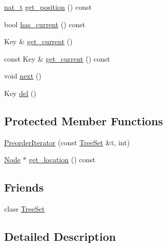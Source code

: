 \begin{DoxyCompactItemize}
\item 
\hyperlink{namespace_designar_aa72662848b9f4815e7bf31a7cf3e33d1}{nat\+\_\+t} \hyperlink{class_designar_1_1_tree_set_1_1_preorder_iterator_a76a9499f0414651a4399f57f7568b168}{get\+\_\+position} () const
\item 
bool \hyperlink{class_designar_1_1_tree_set_1_1_preorder_iterator_a24d3c99c070468afe487e41fb17fec2d}{has\+\_\+current} () const
\item 
Key \& \hyperlink{class_designar_1_1_tree_set_1_1_preorder_iterator_a46bb02ac787f59ccd00eb1dc9ec360d1}{get\+\_\+current} ()
\item 
const Key \& \hyperlink{class_designar_1_1_tree_set_1_1_preorder_iterator_a1361ceae79bd57279177e2a1a76ee200}{get\+\_\+current} () const
\item 
void \hyperlink{class_designar_1_1_tree_set_1_1_preorder_iterator_a8d9d382d80687846dc21f9b5445d59c7}{next} ()
\item 
Key \hyperlink{class_designar_1_1_tree_set_1_1_preorder_iterator_aafc85391980a0a0d29b1f86827c47018}{del} ()
\end{DoxyCompactItemize}
\subsection*{Protected Member Functions}
\begin{DoxyCompactItemize}
\item 
\hyperlink{class_designar_1_1_tree_set_1_1_preorder_iterator_af0ff9e1f0ab3f2d488565b0337cd5205}{Preorder\+Iterator} (const \hyperlink{class_designar_1_1_tree_set}{Tree\+Set} \&t, int)
\item 
\hyperlink{class_designar_1_1_tree_set_a7409a9c1545c0e9e2fd6b84120713c99}{Node} $\ast$ \hyperlink{class_designar_1_1_tree_set_1_1_preorder_iterator_a869f68f8626743605781bb18cfd13bbb}{get\+\_\+location} () const
\end{DoxyCompactItemize}
\subsection*{Friends}
\begin{DoxyCompactItemize}
\item 
class \hyperlink{class_designar_1_1_tree_set_1_1_preorder_iterator_a7caa42294700d2a60905ec3458a7cd8a}{Tree\+Set}
\end{DoxyCompactItemize}


\subsection{Detailed Description}
